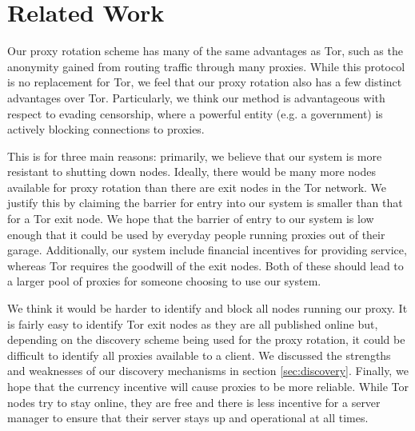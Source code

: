 \section{Related Work}
\label{sec:related}

Our proxy rotation scheme has many of the same advantages as Tor, such as the anonymity gained from routing traffic through many proxies. While this protocol is no replacement for Tor, we feel that our proxy rotation also has a few distinct advantages over Tor. Particularly, we think our method is advantageous with respect to evading censorship, where a powerful entity (e.g. a government) is actively blocking connections to proxies.

This is for three main reasons: primarily, we believe that our system is more resistant to shutting down nodes. Ideally, there would be many more nodes available for proxy rotation than there are exit nodes in the Tor network. We justify this by claiming the barrier for entry into our system is smaller than that for a Tor exit node. We hope that the barrier of entry to our system is low enough that it could be used by everyday people running proxies out of their garage.  Additionally, our system include financial incentives for providing service, whereas Tor requires the goodwill of the exit nodes. Both of these should lead to a larger pool of proxies for someone choosing to use our system.

We think it would be harder to identify and block all nodes running our proxy. It is fairly easy to identify Tor exit nodes as they are all published online\cite{tor:node} but, depending on the discovery scheme being used for the proxy rotation, it could be difficult to identify all proxies available to a client. We discussed the strengths and weaknesses of our discovery mechanisms in section \ref{sec:discovery}. Finally, we hope that the currency incentive will cause proxies to be more reliable. While Tor nodes try to stay online, they are free and there is less incentive for a server manager to ensure that their server stays up and operational at all times.


